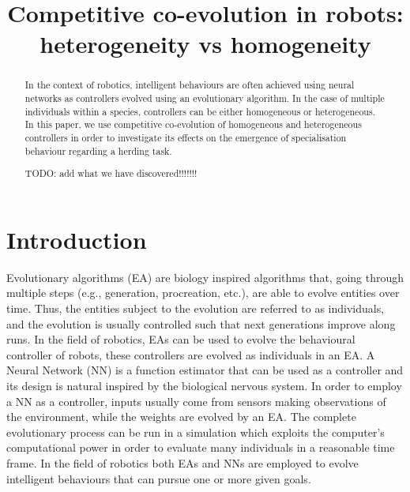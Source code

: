 \documentclass[conference]{IEEEtran}
\begin{document}
 
\title{Competitive co-evolution in robots: \\ heterogeneity vs homogeneity}



\author{
}



\maketitle


\begin{abstract}
In the context of robotics, intelligent behaviours are often achieved using neural networks as controllers evolved using  an evolutionary algorithm.
In the case of multiple individuals within a species, controllers can be either homogeneous or heterogeneous.
In this paper, we use competitive co-evolution of homogeneous and heterogeneous controllers in order to investigate its effects on the emergence of specialisation behaviour regarding a herding task.

TODO: add what we have discovered!!!!!!!
\end{abstract}


\IEEEpeerreviewmaketitle


\section{Introduction}
Evolutionary algorithms (EA) are biology inspired algorithms that, going through multiple steps (e.g., generation, procreation, etc.), are able to evolve entities over time.
Thus, the entities subject to the evolution are referred to as individuals,
and the evolution is usually controlled such that next generations improve along runs.
In the field of robotics, EAs can be used to evolve the behavioural controller of robots, these controllers are evolved as individuals in an EA.
A Neural Network (NN) is a function estimator that can be used as a controller and its design is natural inspired by the biological nervous system.
In order to employ a NN as a controller, inputs usually come from sensors making observations of the environment, while the weights are evolved by an EA.
The complete evolutionary process can be run in a simulation which exploits the computer's computational power in order to evaluate many individuals in a reasonable time frame. 
In the field of robotics both EAs and NNs are employed to evolve intelligent behaviours that can pursue one or more given goals.
\end{document}
